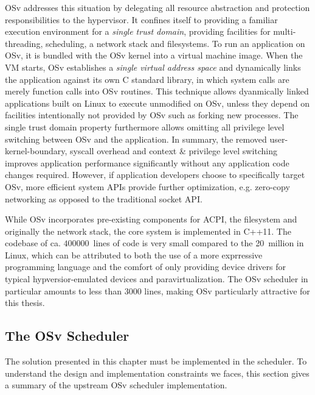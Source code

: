 \documentclass[12pt,a4paper]{book}
\begin{document}
OSv addresses this situation by delegating all resource abstraction and protection responsibilities to the hypervisor.
It confines itself to providing a familiar execution environment for a \emph{single trust domain}, providing facilities for multi-threading, scheduling, a network stack and filesystems.
To run an application on OSv, it is bundled with the OSv kernel into a virtual machine image.
When the VM starts, OSv establishes a \emph{single virtual address space} and dynamically links the application against its own C standard library, in which system calls are merely function calls into OSv routines.
This technique allows dyanmically linked applications built on Linux to execute unmodified on OSv, unless they depend on facilities intentionally not provided by OSv such as forking new processes.
The single trust domain property furthermore allows omitting all privilege level switching between OSv and the application.
In summary, the removed user-kernel-boundary, syscall overhead and context \& privilege level switching improves application performance significantly without any application code changes required.
However, if application developers choose to specifically target OSv, more efficient system APIs provide further optimization, e.g. zero-copy networking as opposed to the traditional socket API.~\cite{osvMain}

While OSv incorporates pre-existing components for ACPI, the filesystem and originally the network stack, the core system is implemented in C++11.
The codebase of ca. $400000$~lines of code is very small compared to the 20~million in Linux, %
which can be attributed to both the use of a more exprressive programming language and the comfort of only providing device drivers for typical hypversior-emulated devices and paravirtualization.
The OSv scheduler in particular amounts to less than 3000 lines, making OSv particularly attractive for this thesis.%
~\cite{osvMain}

\subsection{The OSv Scheduler}
The solution presented in this chapter must be implemented in the scheduler.
To understand the design and implementation constraints we faces, this section gives a summary of the upstream OSv scheduler implementation.
\end{document}
